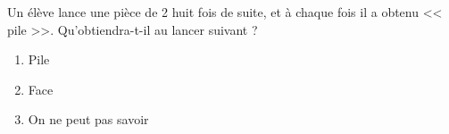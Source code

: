 Un élève lance une pièce de \qty{2}{\EURO} huit fois de suite, et à chaque fois il a obtenu << pile >>. Qu'obtiendra-t-il au lancer suivant ?
\begin{multicols}{3}
\begin{enumerate}[label=\textbf{\alph*)}]
    \item Pile 
    \item Face
    \item On ne peut pas savoir
\end{enumerate}
\end{multicols}